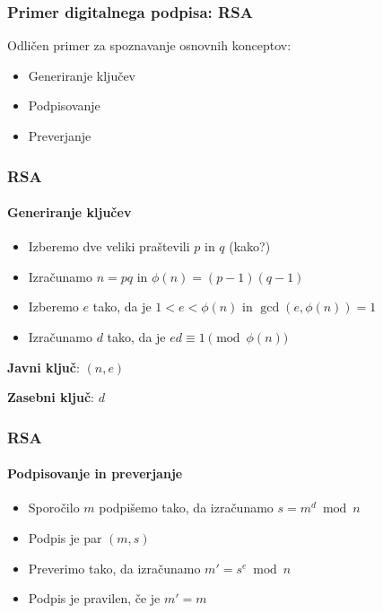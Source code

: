 \documentclass{beamer}    %
\begin{document}
\begin{frame}
    \frametitle{Primer digitalnega podpisa: RSA}
    Odličen primer za spoznavanje osnovnih konceptov:
    \vspace{1cm}
    \begin{itemize}
        \item Generiranje ključev
        \item Podpisovanje
        \item Preverjanje 
    \end{itemize}
\end{frame}

\begin{frame}
    \frametitle{RSA}
    \framesubtitle{Generiranje ključev}
    \begin{itemize}
        \item Izberemo dve \alert{veliki} praštevili $p$ in $q$ (kako?)
        \item Izračunamo $n = pq$ in $\phi(n) = (p-1)(q-1)$
        \item Izberemo $e$ tako, da je $1 < e < \phi(n)$ in $\gcd(e, \phi(n)) = 1$
        \item Izračunamo $d$ tako, da je $ed \equiv 1 \pmod{\phi(n)}$
    \end{itemize}
    \vspace{1cm}
    \begin{multicols*}{2}
        \textbf{Javni ključ}: $(n, e)$
        \columnbreak

        \textbf{Zasebni ključ}: $d$
    \end{multicols*}
\end{frame}

\begin{frame}
    \frametitle{RSA}
    \framesubtitle{Podpisovanje in preverjanje}
    \begin{itemize}
        \item Sporočilo $m$ podpišemo tako, da izračunamo $s = m^d \bmod n$
        \item Podpis je par $(m, s)$
    \end{itemize}
    
    \vspace{1cm}
    \begin{itemize}
        \item Preverimo tako, da izračunamo $m' = s^e \bmod n$
        \item Podpis je pravilen, če je $m' = m$
    \end{itemize}
\end{frame}
\end{document}
